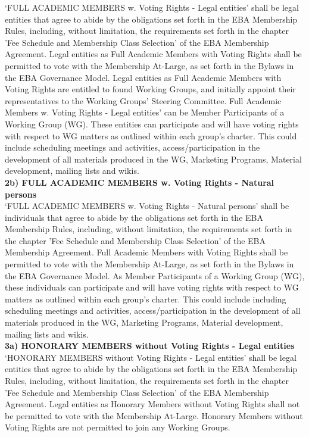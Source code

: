 \documentclass{article}
\begin{document}
‘FULL ACADEMIC MEMBERS w. Voting Rights - Legal entities’ shall be legal entities that agree to abide by the obligations set forth in the EBA Membership Rules, including, without limitation, the requirements set forth in the chapter 'Fee Schedule and Membership Class Selection' of the EBA Membership Agreement. 
Legal entities as Full Academic Members with Voting Rights shall be permitted to vote with the Membership At-Large, as set forth in the Bylaws in the EBA Governance Model. Legal entities as Full Academic Members with Voting Rights are entitled to found Working Groups, and initially appoint their representatives to the Working Groups’ Steering Committee. 
Full Academic Members w. Voting Rights - Legal entities’ can be Member Participants of a Working Group (WG). These entities can participate and will have voting rights with respect to WG matters as outlined within each group's charter. 
This could include scheduling meetings and activities, access/participation in the development of all materials produced in the WG, Marketing Programs, Material development, mailing lists and wikis. \\

\textbf{2b) FULL ACADEMIC MEMBERS w. Voting Rights - Natural persons} \\

‘FULL ACADEMIC MEMBERS w. Voting Rights - Natural persons’ shall be individuals that agree to abide by the obligations set forth in the EBA Membership Rules, including, without limitation, the requirements set forth in the chapter 'Fee Schedule and Membership Class Selection' of the EBA Membership Agreement. 
Full Academic Members with Voting Rights shall be permitted to vote with the Membership At-Large, as set forth in the Bylaws in the EBA Governance Model. 
As Member Participants of a Working Group (WG), these individuals can participate and will have voting rights with respect to WG matters as outlined within each group's charter. 
This could include including scheduling meetings and activities, access/participation in the development of all materials produced in the WG, Marketing Programs, Material development, mailing lists and wikis. \\

\textbf{3a) HONORARY MEMBERS without Voting Rights - Legal entities} \\

‘HONORARY MEMBERS without Voting Rights - Legal entities’ shall be legal entities that agree to abide by the obligations set forth in the EBA Membership Rules, including, without limitation, the requirements set forth in the chapter 'Fee Schedule and Membership Class Selection' of the EBA Membership Agreement. 
Legal entities as Honorary Members without Voting Rights shall not be permitted to vote with the Membership At-Large. 
Honorary Members without Voting Rights are not permitted to join any Working Groups. \\
\end{document}
